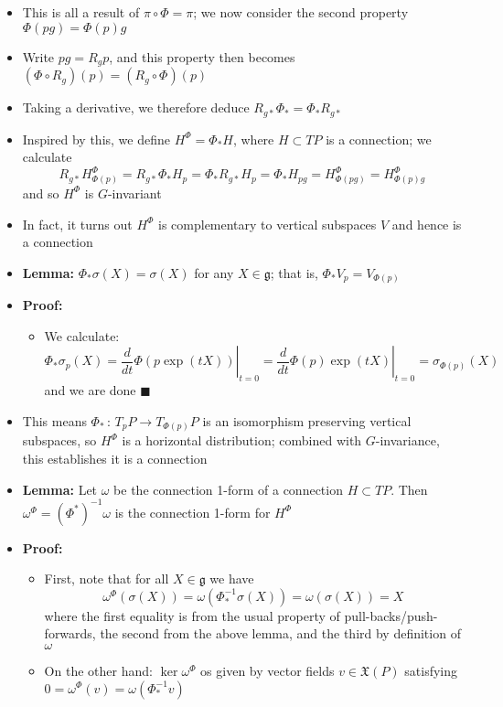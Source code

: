 \documentclass[12pt,a4paper]{article}
\numberwithin{equation}{section}
\begin{document}
\begin{itemize}
		\item This is all a result of $\pi\circ\Phi=\pi$; we now consider the second property $\Phi(pg)=\Phi(p)g$
		\item Write $pg=R_{g}p$, and this property then becomes $(\Phi\circ R_{g})(p)=(R_{g}\circ\Phi)(p)$
		\item Taking a derivative, we therefore deduce $R_{g*}\Phi_{*}=\Phi_{*}R_{g*}$
		\item Inspired by this, we define $H^{\Phi}=\Phi_{*}H$, where $H\subset TP$ is a connection; we calculate
		\begin{equation}
			R_{g*}H^{\Phi}_{\Phi(p)}=R_{g*}\Phi_{*}H_{p}=\Phi_{*}R_{g*}H_{p}=\Phi_{*}H_{pg}=H^{\Phi}_{\Phi(pg)}=H^{\Phi}_{\Phi(p)g}
		\end{equation}
		and so $H^{\Phi}$ is $G$-invariant
		\item In fact, it turns out $H^{\Phi}$ is complementary to vertical subspaces $V$ and hence is a connection
		\item \textbf{Lemma:} $\Phi_{*}\sigma(X)=\sigma(X)$ for any $X\in\mathfrak{g}$; that is, $\Phi_{*}V_{p}=V_{\Phi(p)}$
		\item \textbf{Proof:}
		\begin{itemize}
			\item We calculate:
			$$
			\Phi_{*}\sigma_{p}(X)=\left.\frac{d}{dt}\Phi(p\exp(tX))\right\rvert_{t=0}=\left.\frac{d}{dt}\Phi(p)\exp(tX)\right\rvert_{t=0}=\sigma_{\Phi(p)}(X)
			$$
			and we are done $\blacksquare$
		\end{itemize}
		\item This means $\Phi_{*}\,:\,T_{p}P\to T_{\Phi(p)}P$ is an isomorphism preserving vertical subspaces, so $H^{\Phi}$ is a horizontal distribution; combined with $G$-invariance, this establishes it is a connection
		\item \textbf{Lemma:} Let $\omega$ be the connection 1-form of a connection $H\subset TP$. Then $\omega^{\Phi}=(\Phi^{*})^{-1}\omega$ is the connection 1-form for $H^{\Phi}$
		\item \textbf{Proof:}
		\begin{itemize}
			\item First, note that for all $X\in\mathfrak{g}$ we have
			$$
			\omega^{\Phi}(\sigma(X))=\omega(\Phi^{-1}_{*}\sigma(X))=\omega(\sigma(X))=X
			$$
			where the first equality is from the usual property of pull-backs/push-forwards, the second from the above lemma, and the third by definition of $\omega$
			\item On the other hand: $\ker{\omega^{\Phi}}$ os given by vector fields $v\in\mathfrak{X}(P)$ satisfying $0=\omega^{\Phi}(v)=\omega(\Phi^{-1}_{*}v)$

\end{itemize}
\end{itemize}
\end{document}
